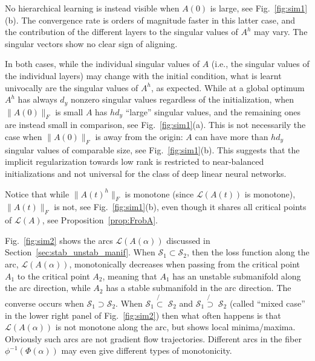 \documentclass{article}
\newcommand{\1}{\mathds{1}}
\begin{document}
No hierarchical learning is instead visible when $ A(0)$ is large, see Fig.~\ref{fig:sim1}(b). The convergence rate is orders of magnitude faster in this latter case, and the contribution of the different layers to the singular values of $ A^h $ may vary. The singular vectors show no clear sign of aligning. 

In both cases, while the individual singular values of $A$ (i.e., the singular values of the individual layers) may change with the initial condition, what is learnt univocally are the singular values of $A^h$, as expected.  
While at a global optimum $ A^h $ has always $ d_y $ nonzero singular values regardless of the initialization, when  $ \|A(0)\|_F$ is small $ A $ has $ h d_y $ ``large'' singular values, and the remaining ones are instead small in comparison, see Fig.~\ref{fig:sim1}(a).
This is not necessarily the case when $ \|A(0)\|_F$ is away from the origin:  $A$ can have more than $ h d_y $ singular values of comparable size, see Fig.~\ref{fig:sim1}(b). This suggests that the implicit regularization towards low rank is restricted to near-balanced initializations and not universal for the class of deep linear neural networks.

Notice that while $ \| A(t)^h\|_F $ is monotone (since $ \mathcal{L}(A(t)) $ is monotone), $ \| A(t) \|_F $ is not, see Fig.~\ref{fig:sim1}(b), even though it shares all critical points of $ \mathcal{L}(A)$, see Proposition~\ref{prop:FrobA}. 

Fig.~\ref{fig:sim2} shows the arcs $ \mathcal{L}(A(\alpha))$ discussed in Section~\ref{sec:stab_unstab_manif}. When $ \mathcal{S}_1 \subset \mathcal{S}_2$, then the loss function along the arc, $ \mathcal{L}(A(\alpha))$, monotonically decreases when passing from the critical point $A_1 $ to the critical point $A_2$, meaning that $ A_1 $ has an unstable submanifold along the arc direction, while $ A_2 $ has a stable submanifold in the arc direction. The converse occurs when $ \mathcal{S}_1 \supset \mathcal{S}_2$. When $ \mathcal{S}_1 \not{\!\!\subset}\; \mathcal{S}_2 $ and $ \mathcal{S}_1 \not{\!\!\supset}\; \mathcal{S}_2 $ (called ``mixed case'' in the lower right panel of Fig.~\ref{fig:sim2}) then what often happens is that $ \mathcal{L}(A(\alpha))$ is not monotone along the arc, but shows local minima/maxima. Obviously such arcs are not gradient flow trajectories.
Different arcs in the fiber $ \phi^{-1}(\Phi(\alpha)) $ may even give different types of monotonicity. 
\end{document}
